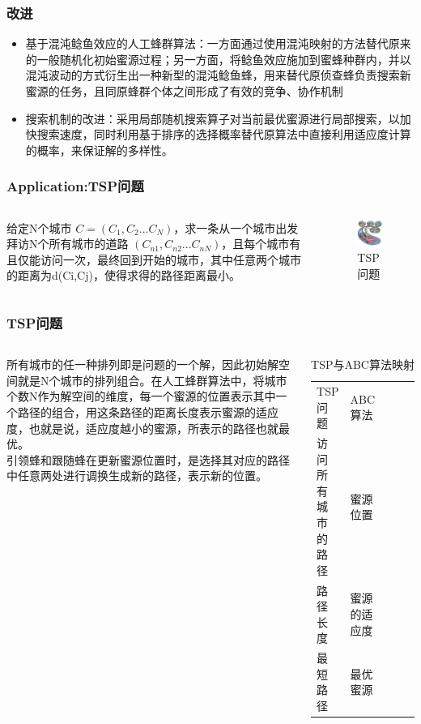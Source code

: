 \begin{frame}
	\frametitle{改进}
	\begin{itemize}
		\item {基于混沌鲶鱼效应的人工蜂群算法：一方面通过使用混沌映射的方法替代原来的一般随机化初始蜜源过程；另一方面，将鲶鱼效应施加到蜜蜂种群内，并以混沌波动的方式衍生出一种新型的混沌鲶鱼蜂，用来替代原侦查蜂负责搜索新蜜源的任务，且同原蜂群个体之间形成了有效的竞争、协作机制}
		\item {搜索机制的改进：采用局部随机搜索算子对当前最优蜜源进行局部搜索，以加快搜索速度，同时利用基于排序的选择概率替代原算法中直接利用适应度计算的概率，来保证解的多样性。}
	\end{itemize}
\end{frame}


\begin{frame}
	\frametitle{Application:TSP问题}
	\begin{columns}
	\qquad 给定N个城市 $C=(C_{1},C_{2}...C_{N})$，求一条从一个城市出发拜访N个所有城市的道路 $(C_{n1},C_{n2}...C_{nN})$，且每个城市有且仅能访问一次，最终回到开始的城市，其中任意两个城市的距离为d(Ci,Cj)，使得求得的路径距离最小。
	\begin{figure}[htbp]
		\flushleft
		\includegraphics[width=3cm]{pic/bee6.jpg}
		\caption{TSP问题}
	\end{figure}
	\end{columns}
\end{frame}


\begin{frame}
	\frametitle{TSP问题}
	\begin{columns}
	\column{.6\textwidth}
	\qquad 所有城市的任一种排列即是问题的一个解，因此初始解空间就是N个城市的排列组合。在人工蜂群算法中，将城市个数N作为解空间的维度，每一个蜜源的位置表示其中一个路径的组合，用这条路径的距离长度表示蜜源的适应度，也就是说，适应度越小的蜜源，所表示的路径也就最优。\\
	\qquad 引领蜂和跟随蜂在更新蜜源位置时，是选择其对应的路径中任意两处进行调换生成新的路径，表示新的位置。
	\column{.4\textwidth}
	\begin{table}[]
	\centering
	\caption{TSP与ABC算法映射}
	\label{my-label}
	\begin{tabular}{|l|l|lll}
	\cline{1-2}
	TSP问题     & ABC算法  &  &  &  \\ \cline{1-2}
	访问所有城市的路径 & 蜜源位置   &  &  &  \\ \cline{1-2}
	路径长度      & 蜜源的适应度 &  &  &  \\ \cline{1-2}	
	最短路径      & 最优蜜源   &  &  &  \\ \cline{1-2}
	\end{tabular}
	\end{table}
	\end{columns}
\end{frame}

